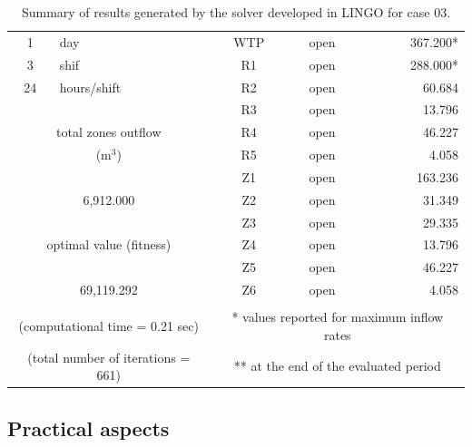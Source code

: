 \documentclass{singlecol}
\theoremstyle{TH}{
\newtheorem{lemma}{Lemma}
\newtheorem{theorem}[lemma]{Theorem}
\newtheorem{corrolary}[lemma]{Corrolary}
\newtheorem{conjecture}[lemma]{Conjecture}
\newtheorem{proposition}[lemma]{Proposition}
\newtheorem{claim}[lemma]{Claim}
\newtheorem{stheorem}[lemma]{Wrong Theorem}
\newtheorem{algorithm}{Algorithm}
}
\theoremstyle{THrm}{
\newtheorem{definition}{Definition}[section]
\newtheorem{question}{Question}[section]
\newtheorem{remark}{Remark}
\newtheorem{scheme}{Scheme}
}
\theoremstyle{THhit}{
\newtheorem{case}{Case}[section]
}
\begin{document}
\begin{table}[h!]
\begin{center}
\begin{small}
\begin{tabular}{ c r r r r r }
		   \\
1   &  \multicolumn{1}{l}{day} &  & \multicolumn{1}{c}{WTP} & \multicolumn{1}{c}{open} &  367.200* \\
3   &  \multicolumn{1}{l}{shif} & & \multicolumn{1}{c}{R1}  & \multicolumn{1}{c}{open} &  288.000* \\
24  &  \multicolumn{1}{l}{hours/shift} & & \multicolumn{1}{c}{R2} & \multicolumn{1}{c}{open} &   60.684\\
	&      &                  & \multicolumn{1}{c}{R3}     & \multicolumn{1}{c}{open} &    13.796 \\
\multicolumn{3}{c}{total zones outflow} & \multicolumn{1}{c}{R4} & \multicolumn{1}{c}{open}  &   46.227 \\
\multicolumn{3}{c}{($\mathrm{m^3}$)}& \multicolumn{1}{c}{R5}     & \multicolumn{1}{c}{open} &     4.058 \\
	   &      &              		& \multicolumn{1}{c}{Z1}     & \multicolumn{1}{c}{open} &   163.236 \\
\multicolumn{3}{c}{6,912.000}       & \multicolumn{1}{c}{Z2}     & \multicolumn{1}{c}{open} &    31.349 \\
	   &      &              		& \multicolumn{1}{c}{Z3}     & \multicolumn{1}{c}{open} &    29.335 \\\multicolumn{3}{c}{optimal value (fitness)} & \multicolumn{1}{c}{Z4} & \multicolumn{1}{c}{open} &13.796 \\
	   &      &             	    & \multicolumn{1}{c}{Z5}     & \multicolumn{1}{c}{open} &    46.227 \\
\multicolumn{3}{c}{69,119.292}       & \multicolumn{1}{c}{Z6}     & \multicolumn{1}{c}{open} &     4.058 \\\\
\multicolumn{3}{c}{(computational time  = 0.21 sec)}     & \multicolumn{3}{c}{* values reported for maximum inflow rates} \\
\multicolumn{3}{c}{(total number of iterations = 661)}   & \multicolumn{3}{c}{** at the end of the evaluated period} 
	\end{tabular}
\end{small}
\caption{Summary of results generated by the solver developed in LINGO for case 03.}
\label{tab:lingoEvalCase03}
\end{center}
\end{table}

\subsection{Practical aspects}
\label{sec:praticalAspects}
\end{document}
